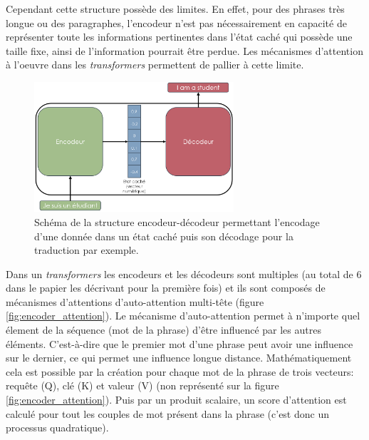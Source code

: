 Cependant cette structure possède des limites. En effet, pour des phrases très longue ou des paragraphes, l'encodeur n'est pas nécessairement en capacité de représenter toute les informations pertinentes dans l'état caché qui possède une taille fixe, ainsi de l'information pourrait être perdue. Les mécanismes d'attention à l'oeuvre dans les \textit{transformers} permettent de pallier à cette limite.
\begin{figure}[!htbp]
 \centering
 \includegraphics[width=0.66\textwidth]{figures/encoder_decoder.png}
 \caption[Schéma de la structure encodeur-décodeur]{Schéma de la structure encodeur-décodeur permettant l'encodage d'une donnée dans un état caché puis son décodage pour la traduction par exemple. }
 \label{fig:encoder_decoder}
\end{figure}

Dans un \textit{transformers} les encodeurs et les décodeurs sont multiples (au total de 6 dans le papier les décrivant pour la première fois) et ils sont composés de mécanismes d'attentions d'auto-attention multi-tête (figure \ref{fig:encoder_attention}). Le mécanisme d'auto-attention permet à n'importe quel élement de la séquence (mot de la phrase) d'être influencé par les autres éléments. C'est-à-dire que le premier mot d'une phrase peut avoir une influence sur le dernier, ce qui permet une influence longue distance. Mathématiquement cela est possible par la création pour chaque mot de la phrase de trois vecteurs: requête (Q), clé (K) et valeur (V) (non représenté sur la figure \ref{fig:encoder_attention}). Puis par un produit scalaire, un score d'attention est calculé pour tout les couples de mot présent dans la phrase (c'est donc un processus quadratique).

